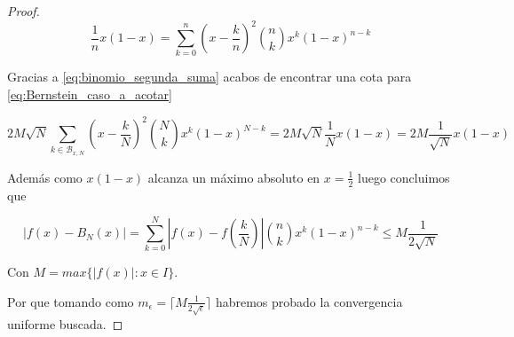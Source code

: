 \begin{proof}
  \begin{equation} \label{eq:binomio_segunda_suma}
     \frac{1}{n} x (1-x)= \sum_{k=0}^{n}  \left( x-\frac{k}{n} \right)^2  \binom{n}{k} x^{k} (1-x)^{n-k}
  \end{equation}

  Gracias a \eqref{eq:binomio_segunda_suma} acabos de encontrar una cota para 
  \eqref{eq:Bernstein_caso_a_acotar}

  \begin{equation}
    2M \sqrt{N} \sum_{k \in \mathcal{B}_{x,N}}  (x- \frac{k}{N})^2 \binom{N}{k} x^k (1-x) ^{N-k}  = 2M \sqrt{N} \frac{1}{N} x (1-x) = 2M  \frac{1}{\sqrt{N}} x (1-x)
  \end{equation}

  Además como $x (1-x)$ alcanza un máximo absoluto en $x=\frac{1}{2}$ luego concluimos que 

  \begin{equation}
    |f(x)-B_N(x)| = \sum_{k=0}^N \left| f(x) - f \left(\frac{k}{N} \right) \right| \binom{n}{k} x^k (1-x) ^{n-k} \leq M \frac{1}{2 \sqrt{N}} 
\end{equation}

    Con $M = max \{ |f(x)| : x \in I\}.$

    Por que tomando como $m_\epsilon = \lceil M \frac{1}{2 \sqrt{ \epsilon }} \rceil$
    habremos probado la convergencia uniforme buscada. 

\end{proof}

 
 
\endinput 